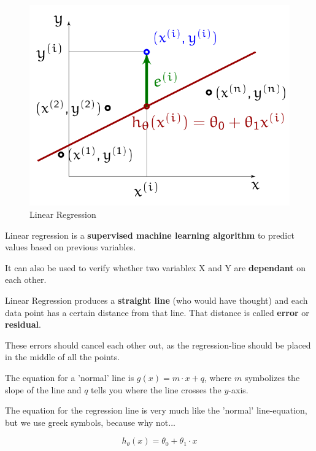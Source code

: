 \documentclass[a4paper, 11pt]{article}
\begin{document}
\begin{figure}
    \centering
    \includegraphics[keepaspectratio=true,height=14\baselineskip]{linear_regression.png}
    \caption{Linear Regression}
    \label{fig:linear_regression}
\end{figure}

Linear regression is a \textbf{supervised machine learning algorithm} to predict values based on previous variables.

It can also be used to verify whether two variablex X and Y are \textbf{dependant} on each other.

\vspace{10px}

Linear Regression produces a \textbf{straight line} (who would have thought) and each data point has a certain distance from that line. That distance is called \textbf{error} or \textbf{residual}. 

These errors should cancel each other out, as the regression-line should be placed in the middle of all the points.

\vspace{10px}

The equation for a 'normal' line is $g(x) = m \cdot x + q$, where $m$ symbolizes the slope of the line and $q$ tells you where the line crosses the $y$-axis.

The equation for the regression line is very much like the 'normal' line-equation, but we use greek symbols, because why not...

\begin{equation}
	h_{\theta}(x) = \theta^{}_{0} + \theta^{}_{1} \cdot x
\end{equation}
\end{document}
